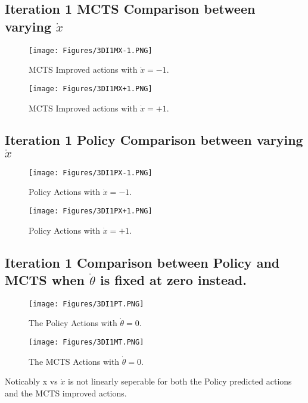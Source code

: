 \documentclass[11.7pt]{article}
\begin{document}
\begin{landscape}
\pagebreak
\subsection{Iteration 1 MCTS Comparison between varying  $\dot{x}$}

\begin{figure}[H]
    \begin{minipage}{0.8\textwidth}
        \centering
        \texttt{[image: Figures/3DI1MX-1.PNG]}
        \caption{MCTS Improved actions with $\dot{x}=-1$.}
        \label{fig:3DI1MX-1}
    \end{minipage}
    \begin{minipage}{0.8\textwidth}
        \centering
        \texttt{[image: Figures/3DI1MX+1.PNG]}
        \caption{MCTS Improved actions with $\dot{x}=+1$.}
        \label{fig:3DI1MX+1}
    \end{minipage}
\end{figure}

\pagebreak
\subsection{Iteration 1 Policy Comparison between varying  $\dot{x}$}
\begin{figure}[H]
    \begin{minipage}{0.8\textwidth}
        \centering
        \texttt{[image: Figures/3DI1PX-1.PNG]}
        \caption{Policy Actions with $\dot{x}=-1$.}
        \label{fig:3DI1PX-1}
    \end{minipage}
    \begin{minipage}{0.8\textwidth}
        \centering
        \texttt{[image: Figures/3DI1PX+1.PNG]}
        \caption{Policy Actions with $\dot{x}=+1$.}
        \label{fig:3DI1PX+1}
    \end{minipage}
\end{figure}

\pagebreak
\subsection{Iteration 1 Comparison between Policy and MCTS when $\dot{\theta}$ is fixed at zero instead.}
\begin{figure}[H]
    \begin{minipage}{0.8\textwidth}
        \centering
        \texttt{[image: Figures/3DI1PT.PNG]}
        \caption{The Policy Actions with $\dot{\theta}=0$.}
        \label{fig:3DI1PT}
    \end{minipage}
    \begin{minipage}{0.8\textwidth}
        \centering
        \texttt{[image: Figures/3DI1MT.PNG]}
        \caption{The MCTS Actions with $\dot{\theta}=0$.}
        \label{fig:3DI1MT}
    \end{minipage}
\end{figure}

Noticably x vs $\dot{x}$ is not linearly seperable for both the Policy predicted actions and the MCTS improved actions.

\end{landscape}
\end{document}
